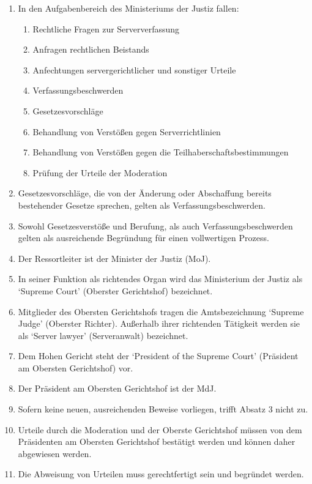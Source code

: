 \documentclass{article}
\begin{document}
\begin{enumerate}[(1)]
	\item In den Aufgabenbereich des Ministeriums der Justiz fallen:
	\begin{enumerate}[1.]
		\item Rechtliche Fragen zur Serververfassung
		\item Anfragen rechtlichen Beistands
		\item Anfechtungen servergerichtlicher und sonstiger Urteile
		\item Verfassungsbeschwerden
		\item Gesetzesvorschläge
		\item Behandlung von Verstößen gegen Serverrichtlinien
		\item Behandlung von Verstößen gegen die Teilhaberschaftsbestimmungen
		\item Prüfung der Urteile der Moderation
	\end{enumerate}
	\item Gesetzesvorschläge, die von der Änderung oder Abschaffung bereits bestehender Gesetze sprechen, gelten als Verfassungsbeschwerden.
	\item Sowohl Gesetzesverstöße und Berufung, als auch Verfassungsbeschwerden gelten als ausreichende Begründung für einen vollwertigen Prozess.
	\item Der Ressortleiter ist der Minister der Justiz (MoJ).
	\item In seiner Funktion als richtendes Organ wird das Ministerium der Justiz als `Supreme Court' (Oberster Gerichtshof) bezeichnet.
	\item Mitglieder des Obersten Gerichtshofs tragen die Amtsbezeichnung `Supreme Judge' (Oberster Richter). Außerhalb ihrer richtenden Tätigkeit werden sie als `Server lawyer' (Serveranwalt) bezeichnet.
	\item Dem Hohen Gericht steht der `President of the Supreme Court' (Präsident am Obersten Gerichtshof) vor.
	\item Der Präsident am Obersten Gerichtshof ist der MdJ.\@
	\item Sofern keine neuen, ausreichenden Beweise vorliegen, trifft Absatz 3 nicht zu.
	\item Urteile durch die Moderation und der Oberste Gerichtshof müssen von dem Präsidenten am Obersten Gerichtshof bestätigt werden und können daher abgewiesen werden.
	\item Die Abweisung von Urteilen muss gerechtfertigt sein und begründet werden.
\end{enumerate}
\end{document}
